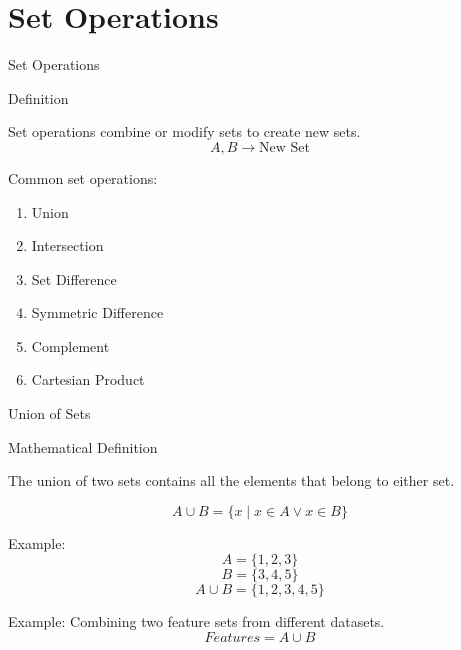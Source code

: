 \section{Set Operations}


\begin{frame}{Set Operations}

\begin{block}{Definition}

\vspace{0.1cm}

Set operations combine or modify sets to create new sets.
\[
A,B \rightarrow \text{New Set}
\]

\end{block}

\vspace{0.1cm}

Common set operations:

\begin{enumerate}
    \item Union
    \item Intersection
    \item Set Difference
    \item Symmetric Difference
    \item Complement
    \item Cartesian Product
\end{enumerate}


\end{frame}


\begin{frame}{Union of Sets}

\begin{block}{Mathematical Definition}

\vspace{0.1cm}

The union of two sets contains all the elements that belong
to either set.

\[
A\cup B=\{x\mid x\in A\lor x\in B\}
\]

\end{block}

\vspace{0.1cm}

Example:
\[
A=\{1,2,3\}
\]
\[
B=\{3,4,5\}
\]
\[
A\cup B=\{1,2,3,4,5\}
\]

Example:
Combining two feature sets from different datasets.
\[
Features =
A\cup B
\]

\end{frame}

